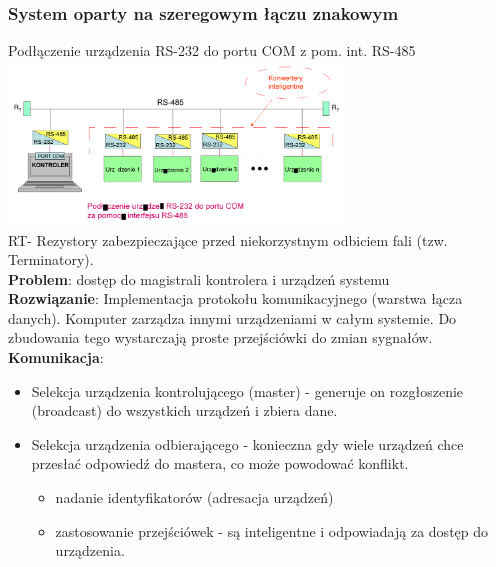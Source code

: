 \documentclass[a4paper,twoside]{article}
\begin{document}
		\subsubsection{System oparty na szeregowym łączu znakowym}
		Podłączenie urządzenia RS-232 do portu COM z pom. int. RS-485\\
		\includegraphics[width=9cm]{./wyklady/RS232_14_1.pdf}\\
		R\tiny T\normalsize - Rezystory zabezpieczające przed niekorzystnym odbiciem fali (tzw. Terminatory).\\
		\textbf{Problem}: dostęp do magistrali kontrolera i urządzeń systemu\\
		\textbf{Rozwiązanie}: Implementacja protokołu komunikacyjnego (warstwa łącza danych). Komputer zarządza innymi urządzeniami w całym systemie. Do zbudowania tego wystarczają proste przejściówki do zmian sygnałów.\\
		\textbf{Komunikacja}:
		\begin{itemize}
			\item Selekcja urządzenia kontrolującego (master) - generuje on rozgłoszenie (broadcast) do wszystkich urządzeń i zbiera dane.
			\item Selekcja urządzenia odbierającego - konieczna gdy wiele urządzeń chce przesłać odpowiedź do mastera, co może powodować konflikt.
			\begin{itemize}
				\item nadanie identyfikatorów (adresacja urządzeń)
				\item zastosowanie przejściówek - są inteligentne i odpowiadają za dostęp do urządzenia.
			\end{itemize}
		\end{itemize}
\end{document}
